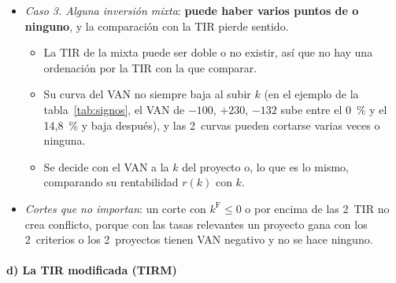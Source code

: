 \documentclass[11pt]{article}
\begin{document}
\begin{anotaciones}
\begin{itemize}
\begin{itemize}
  \item La diferencia es positiva en los 2~extremos, con $k=0$ y con $k=\mathrm{TIR}_{\mathrm B}$, así que se anula un número par de veces: ninguna si el proyecto diferencia es simple.
  \item Si el proyecto diferencia tiene varios cambios de signo, las curvas pueden cortarse 2~veces, y B tener más VAN en un tramo intermedio de tasas.
  \end{itemize}
\item \emph{Caso 3. Alguna inversión mixta}: \textbf{puede haber varios puntos de  o ninguno}, y la comparación con la TIR pierde sentido.
  \begin{itemize}
  \item La TIR de la mixta puede ser doble o no existir, así que no hay una ordenación por la TIR con la que comparar.
  \item Su curva del VAN no siempre baja al subir $k$ (en el ejemplo de la tabla~\ref{tab:signos}, el VAN de $-100$, $+230$, $-132$ sube entre el 0~\% y el 14,8~\% y baja después), y las 2~curvas pueden cortarse varias veces o ninguna.
  \item Se decide con el VAN a la $k$ del proyecto o, lo que es lo mismo, comparando su rentabilidad $r(k)$ con $k$.
  \end{itemize}
\item \emph{Cortes que no importan}: un corte con $k^{\mathrm F}\leq 0$ o por encima de las 2~TIR no crea conflicto, porque con las tasas relevantes un proyecto gana con los 2~criterios o los 2~proyectos tienen VAN negativo y no se hace ninguno.
\end{itemize}
\end{anotaciones}

\paragraph{d) La TIR modificada (TIRM)}
\end{document}
